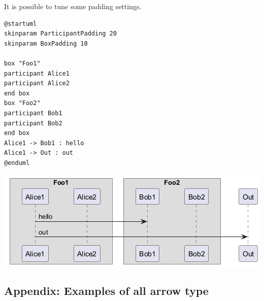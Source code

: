 It is possible to tune some padding settings.


\begin{verbatim}
@startuml
skinparam ParticipantPadding 20
skinparam BoxPadding 10

box "Foo1"
participant Alice1
participant Alice2
end box
box "Foo2"
participant Bob1
participant Bob2
end box
Alice1 -> Bob1 : hello
Alice1 -> Out : out
@enduml
\end{verbatim}
\begin{center}
\includegraphics[scale=0.60]{imgw/img-f615013811d01bf754d534fd0543e550.png}
\end{center}




%
%
\subsection{Appendix: Examples of all arrow type}



